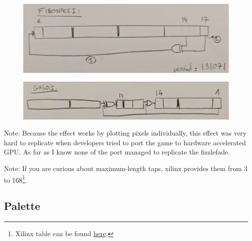 \begin{figure}[H] \centering \includegraphics[width=\textwidth]{imgs/fizzlefade/fibonnaci.png} \end{figure}
\begin{figure}[H] \centering \includegraphics[width=\textwidth]{imgs/fizzlefade/galois.png} \end{figure}
      
Note: Because the effect works by plotting pixels individually, this effect was very hard to replicate when developers tried to port the game to hardware accelerated GPU. As far as I know none of the port managed to replicate the fizzlefade.

Note: If you are curious about maximum-length taps, xilinx provides them from 3 to 168\footnote{Xilinx table can be found \href{http://www.xilinx.com/support/documentation/application\_notes/xapp052.pdf}{here}.}.










\subsection{Palette}

